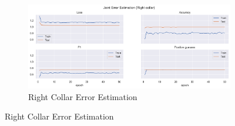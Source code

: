 \begin{figure}[!htbp]
\begin{subfigure}[b]{0.47\linewidth}
      \label{fig:v1_leco_jt_ee}
  \end{subfigure}
  \hfill
  \begin{subfigure}[b]{0.47\linewidth}
      \centering
      \includegraphics[width=\textwidth]{figures/Results/v1/jt/Right collar_ErrorEstimation.png}
      \caption{Right Collar Error Estimation}
      \label{fig:v1_rico_jt_ee}
  \end{subfigure}
\end{figure}


